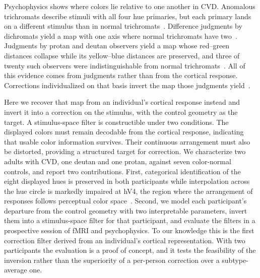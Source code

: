 Psychophysics shows where colors lie relative to one another in CVD. Anomalous trichromats describe stimuli with all four hue primaries, but each primary lands on a different stimulus than in normal trichromats~\citep{emery2021}. Difference judgments by dichromats yield a map with one axis where normal trichromats have two~\citep{saysani2018}. Judgments by protan and deutan observers yield a map whose red--green distances collapse while its yellow--blue distances are preserved, and three of twenty such observers were indistinguishable from normal trichromats~\citep{ohkoba2021}. All of this evidence comes from judgments rather than from the cortical response. Corrections individualized on that basis invert the map those judgments yield~\citep{ohkoba2021}.

Here we recover that map from an individual's cortical response instead and invert it into a correction on the stimulus, with the control geometry as the target. A stimulus-space filter is constructible under two conditions. The displayed colors must remain decodable from the cortical response, indicating that usable color information survives. Their continuous arrangement must also be distorted, providing a structured target for correction. We characterize two adults with CVD, one deutan and one protan, against seven color-normal controls, and report two contributions. First, categorical identification of the eight displayed hues is preserved in both participants while interpolation across the hue circle is markedly impaired at hV4, the region where the arrangement of responses follows perceptual color space~\citep{brouwer2009}. Second, we model each participant's departure from the control geometry with two interpretable parameters, invert them into a stimulus-space filter for that participant, and evaluate the filters in a prospective session of fMRI and psychophysics. To our knowledge this is the first correction filter derived from an individual's cortical representation. With two participants the evaluation is a proof of concept, and it tests the feasibility of the inversion rather than the superiority of a per-person correction over a subtype-average one.
